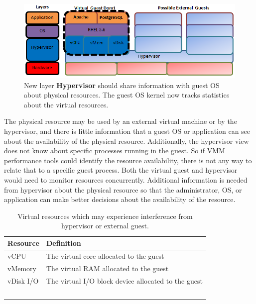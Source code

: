 \begin{figure}[!h]
  \begin{center}
  \includegraphics[width=6in]{images/LayersVirtual.png}
  \caption{New layer \textbf{Hypervisor} should share information with guest OS about physical resources.  The guest OS kernel now tracks statistics about the virtual resources.}
  \label{LayersAndResources}
  \end{center}
\end{figure}

The physical resource may be used by an external virtual machine or by the hypervisor, and there is little information that a guest OS or application can see about the availability of the physical resource.
Additionally, the hypervisor view does not know about specific processes running in the guest.  So if VMM performance tools could identify the resource availability, there is not any way to relate that to a specific guest process.  Both the virtual guest and hypervisor would need to monitor resources concurrently. 
Additional information is needed from hypervisor about the physical resource so that the administrator, OS, or application can make better decisions about the availability of the resource. 

\begin{table}[h]
  \begin{tabular}{ l p{10cm} }
    Resource & Definition \\
    \hline
    vCPU & The virtual core allocated to the guest \\
    vMemory & The virtual RAM allocated to the guest \\
    vDisk I/O & The virtual I/O block device allocated to the guest \\
    \hline
  \end{tabular}
\caption{Virtual resources which may experience interference from hypervisor or external guest.}
\label{tab:resources}
\end{table}

